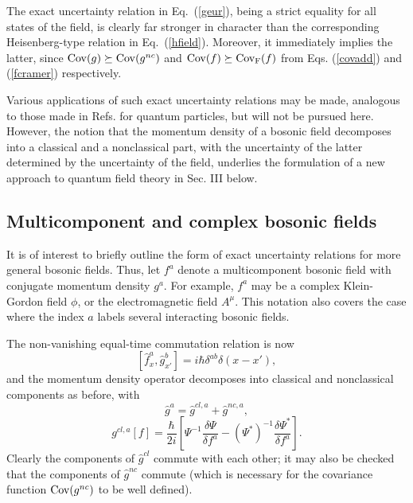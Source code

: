 \documentclass[a4paper,preprint, showpacs, aps, draft]{revtex4}
\begin{document}
{The exact uncertainty relation in Eq.~(\ref{geur}), being a strict
equality for all states of the field, is clearly far
stronger in character than the corresponding Heisenberg-type relation in 
Eq.~(\ref{hfield}).  Moreover, it immediately implies the latter, since ${\rm
Cov}(g) \succeq {\rm Cov}(g^{nc})$ and ${\rm Cov}(f) \succeq {\rm
Cov_F}(f)$ from Eqs. (\ref{covadd}) and (\ref{fcramer}) respectively. 

Various applications of such exact 
uncertainty relations may be made, analogous
to those made in Refs. \cite{hallfish, eur} for quantum particles,
but will not be pursued here.  However, the notion that the momentum
density of a bosonic field 
decomposes into a classical and a nonclassical part, with the
uncertainty of the latter determined by the uncertainty of the field,
underlies the formulation of a new approach to quantum field
theory in Sec. III below.

\subsection{Multicomponent and complex bosonic fields}
It is of interest to briefly outline the form of exact uncertainty
relations for more general bosonic fields.  
Thus, let $f^a$
denote a multicomponent bosonic field with conjugate momentum density
$g^a$.  For example, $f^a$ may be a complex Klein-Gordon field $\phi$,
or the electromagnetic field $A^\mu$. This notation 
also covers the case where the index $a$ labels 
several interacting bosonic fields.
 
The non-vanishing equal-time commutation relation is now
\begin{equation}
\left[\hat{f}^a_x, \hat{g}^b_{x'}\right] = i\hbar\delta^{ab}\delta(x-x'),
\end{equation}
and the momentum density operator decomposes into classical and
nonclassical components as before, with
\begin{equation}
\hat{g}^a = \hat{g}^{cl, a} + \hat{g}^{nc, a} ,
\end{equation}
\begin{equation}
g^{cl, a}[f] = \frac{\hbar}{2i}\left[\Psi^{-1}\frac{\delta\Psi}{\delta
f^a} - (\Psi^*)^{-1}\frac{\delta\Psi^*}{\delta f^a}\right] .
\end{equation}
Clearly the components of $\hat{g}^{cl}$ commute with each other;  it
may also be checked that the components of $\hat{g}^{nc}$ commute (which
is necessary for the covariance function ${\rm Cov}(g^{nc})$ 
to be well defined).

}
\end{document}
